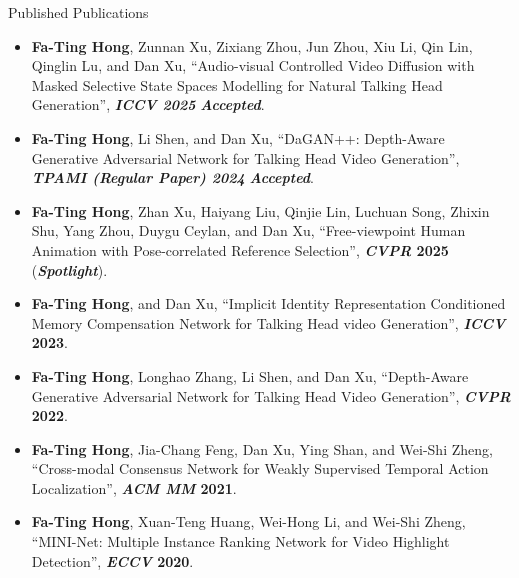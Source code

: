 \documentclass{resume} %
\begin{document}
\begin{rSection}{Published Publications}
    \begin{itemize}[leftmargin=10pt]
    \item \textbf{Fa-Ting Hong}, Zunnan Xu, Zixiang Zhou, Jun Zhou, Xiu Li, Qin Lin, Qinglin Lu, and Dan Xu, ``Audio-visual Controlled Video Diffusion with Masked Selective State Spaces Modelling for Natural Talking Head Generation'', \textbf{\textit{ICCV 2025}} \textbf{\textit{Accepted}}.
    \vspace{-5pt}

    \item \textbf{Fa-Ting Hong}, Li Shen, and Dan Xu, ``DaGAN++: Depth-Aware Generative Adversarial Network for Talking Head Video Generation'', \textbf{\textit{TPAMI (Regular Paper) 2024}} \textbf{\textit{Accepted}}.
    \vspace{-5pt}

    \item \textbf{Fa-Ting Hong}, Zhan Xu, Haiyang Liu, Qinjie Lin, Luchuan Song, Zhixin Shu, Yang Zhou, Duygu Ceylan, and Dan Xu, ``Free-viewpoint Human Animation with Pose-correlated Reference Selection'', \textbf{\textit{CVPR} 2025} (\textbf{\textit{Spotlight}}).
    \vspace{-5pt}

    \item \textbf{Fa-Ting Hong}, and Dan Xu, ``Implicit Identity Representation Conditioned Memory Compensation Network for Talking Head video Generation'', \textbf{\textit{ICCV} 2023}.
    \vspace{-5pt}

    \item \textbf{Fa-Ting Hong}, Longhao Zhang, Li Shen, and Dan Xu, ``Depth-Aware Generative Adversarial Network for Talking Head Video Generation'', \textbf{\textit{CVPR} 2022}.
    \vspace{-5pt}

    \item \textbf{Fa-Ting Hong}, Jia-Chang Feng, Dan Xu, Ying Shan, and Wei-Shi Zheng, ``Cross-modal Consensus Network for Weakly Supervised Temporal Action Localization'', \textbf{\textit{ACM MM} 2021}.
    \vspace{-5pt}

    \item \textbf{Fa-Ting Hong}, Xuan-Teng Huang, Wei-Hong Li, and Wei-Shi Zheng, ``MINI-Net: Multiple Instance Ranking Network for Video Highlight Detection'', \textbf{\textit{ECCV} 2020}.
    \vspace{-5pt}


\end{itemize}
\end{rSection}
\end{document}
